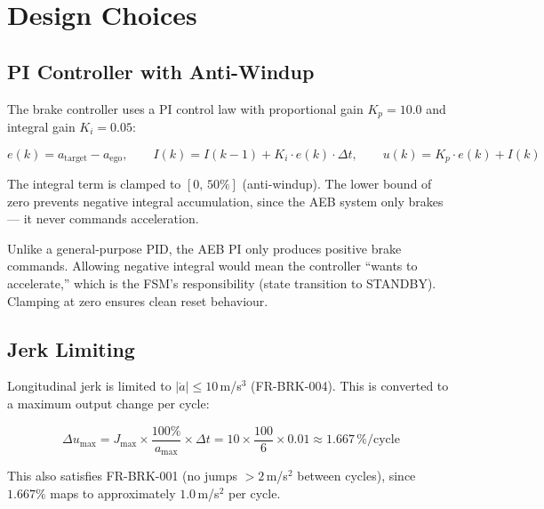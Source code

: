 \documentclass[12pt]{article}
\begin{document}
\section{Design Choices}

\subsection{PI Controller with Anti-Windup}

The brake controller uses a PI control law with proportional gain $K_p = 10.0$ and integral gain $K_i = 0.05$:

\begin{equation}
e(k) = a_{\text{target}} - a_{\text{ego}}, \qquad
I(k) = I(k{-}1) + K_i \cdot e(k) \cdot \Delta t, \qquad
u(k) = K_p \cdot e(k) + I(k)
\end{equation}

The integral term is clamped to $[0,\,50\%]$ (anti-windup). The lower bound of zero prevents negative integral accumulation, since the AEB system only brakes --- it never commands acceleration.

\begin{tcolorbox}[colback=ddbrownlight, colframe=ddbrown, title=\textbf{Design Decision: Integral clamp at zero}]
Unlike a general-purpose PID, the AEB PI only produces positive brake commands. Allowing negative integral would mean the controller ``wants to accelerate,'' which is the FSM's responsibility (state transition to STANDBY). Clamping at zero ensures clean reset behaviour.
\end{tcolorbox}

\subsection{Jerk Limiting}

Longitudinal jerk is limited to $|\dot{a}| \leq 10$\,m/s$^3$ (FR-BRK-004). This is converted to a maximum output change per cycle:

\begin{equation}
\Delta u_{\max} = J_{\max} \times \frac{100\%}{a_{\max}} \times \Delta t = 10 \times \frac{100}{6} \times 0.01 \approx 1.667\,\%/\text{cycle}
\end{equation}

This also satisfies FR-BRK-001 (no jumps $> 2$\,m/s$^2$ between cycles), since $1.667\%$ maps to approximately $1.0$\,m/s$^2$ per cycle.
\end{document}
